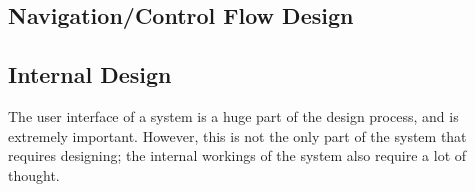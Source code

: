  

%	
%	



\subsection{Navigation/Control Flow Design}	
\label{subsec:nav}	

\subsection{Internal Design}
The user interface of a system is a huge part of the design process, and is extremely important. However, this is not the only part of the system that requires designing; the internal workings of the system also require a lot of thought. 
